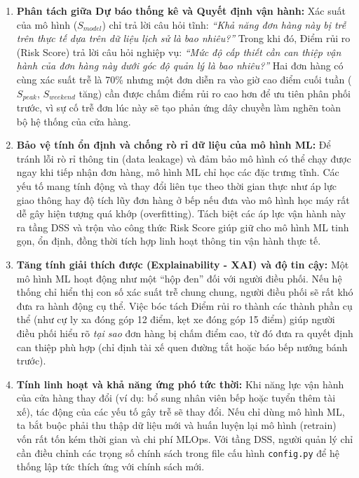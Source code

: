 \documentclass[12pt,a4paper,oneside]{report}
\newcommand{\code}[1]{\nolinkurl{#1}}
\begin{document}
\begin{enumerate}
    \item \textbf{Phân tách giữa Dự báo thống kê và Quyết định vận hành:} Xác suất của mô hình ($S_{model}$) chỉ trả lời câu hỏi tĩnh: \emph{``Khả năng đơn hàng này bị trễ trên thực tế dựa trên dữ liệu lịch sử là bao nhiêu?''} Trong khi đó, Điểm rủi ro (Risk Score) trả lời câu hỏi nghiệp vụ: \emph{``Mức độ cấp thiết cần can thiệp vận hành của đơn hàng này dưới góc độ quản lý là bao nhiêu?''} Hai đơn hàng có cùng xác suất trễ là 70\% nhưng một đơn diễn ra vào giờ cao điểm cuối tuần ($S_{peak}$, $S_{weekend}$ tăng) cần được chấm điểm rủi ro cao hơn để ưu tiên phân phối trước, vì sự cố trễ đơn lúc này sẽ tạo phản ứng dây chuyền làm nghẽn toàn bộ hệ thống của cửa hàng.
    \item \textbf{Bảo vệ tính ổn định và chống rò rỉ dữ liệu của mô hình ML:} Để tránh lỗi rò rỉ thông tin (data leakage) và đảm bảo mô hình có thể chạy được ngay khi tiếp nhận đơn hàng, mô hình ML chỉ học các đặc trưng tĩnh. Các yếu tố mang tính động và thay đổi liên tục theo thời gian thực như áp lực giao thông hay độ tích lũy đơn hàng ở bếp nếu đưa vào mô hình học máy rất dễ gây hiện tượng quá khớp (overfitting). Tách biệt các áp lực vận hành này ra tầng DSS và trộn vào công thức Risk Score giúp giữ cho mô hình ML tinh gọn, ổn định, đồng thời tích hợp linh hoạt thông tin vận hành thực tế.
    \item \textbf{Tăng tính giải thích được (Explainability - XAI) và độ tin cậy:} Một mô hình ML hoạt động như một ``hộp đen'' đối với người điều phối. Nếu hệ thống chỉ hiển thị con số xác suất trễ chung chung, người điều phối sẽ rất khó đưa ra hành động cụ thể. Việc bóc tách Điểm rủi ro thành các thành phần cụ thể (như cự ly xa đóng góp 12 điểm, kẹt xe đóng góp 15 điểm) giúp người điều phối hiểu rõ \emph{tại sao} đơn hàng bị chấm điểm cao, từ đó đưa ra quyết định can thiệp phù hợp (chỉ định tài xế quen đường tắt hoặc báo bếp nướng bánh trước).
    \item \textbf{Tính linh hoạt và khả năng ứng phó tức thời:} Khi năng lực vận hành của cửa hàng thay đổi (ví dụ: bổ sung nhân viên bếp hoặc tuyển thêm tài xế), tác động của các yếu tố gây trễ sẽ thay đổi. Nếu chỉ dùng mô hình ML, ta bắt buộc phải thu thập dữ liệu mới và huấn luyện lại mô hình (retrain) vốn rất tốn kém thời gian và chi phí MLOps. Với tầng DSS, người quản lý chỉ cần điều chỉnh các trọng số chính sách trong file cấu hình \code{config.py} để hệ thống lập tức thích ứng với chính sách mới.
\end{enumerate}
\end{document}
